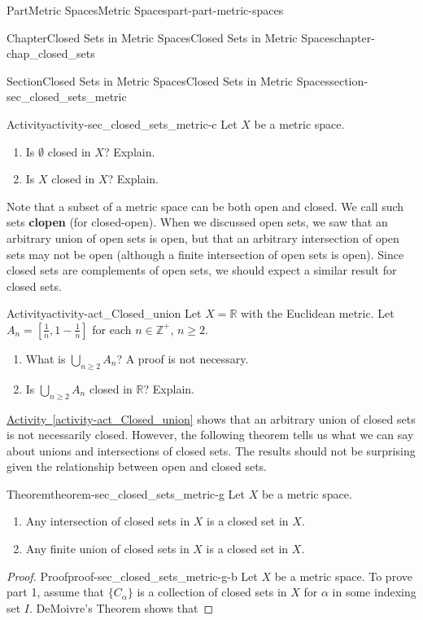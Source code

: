 \documentclass[oneside,10pt,]{book}
\newcommand{\xreffont}{\relax}
\newcommand{\terminology}[1]{\textbf{#1}}
\numberwithin{equation}{chapter}
\newcommand{\Z}{\mathbb{Z}}
\newcommand{\R}{\mathbb{R}}
\begin{document}
\begin{partptx}{Part}{Metric Spaces}{}{Metric Spaces}{}{}{part-part-metric-spaces}
\begin{chapterptx}{Chapter}{Closed Sets in Metric Spaces}{}{Closed Sets in Metric Spaces}{}{}{chapter-chap_closed_sets}
\begin{sectionptx}{Section}{Closed Sets in Metric Spaces}{}{Closed Sets in Metric Spaces}{}{}{section-sec_closed_sets_metric}
\begin{activity}{Activity}{}{activity-sec_closed_sets_metric-c}%
Let \(X\) be a metric space.%
\begin{enumerate}[font=\bfseries,label=(\alph*),ref=\alph*]%
\item{}Is \(\emptyset\) closed in \(X\)? Explain.%
\item{}Is \(X\) closed in \(X\)? Explain.%
\end{enumerate}%
\end{activity}%
Note that a subset of a metric space can be both open and closed. We call such sets \terminology{clopen} (for closed-open). When we discussed open sets, we saw that an arbitrary union of open sets is open, but that an arbitrary intersection of open sets may not be open (although a finite intersection of open sets is open). Since closed sets are complements of open sets, we should expect a similar result for closed sets.%
\begin{activity}{Activity}{}{activity-act_Closed_union}%
Let \(X = \R\) with the Euclidean metric. Let \(A_n = \left[\frac{1}{n}, 1-\frac{1}{n}\right]\) for each \(n \in \Z^+\), \(n \geq 2\).%
\begin{enumerate}[font=\bfseries,label=(\alph*),ref=\alph*]%
\item{}What is \(\bigcup_{n \geq 2} A_n\)? A proof is not necessary.%
\item{}Is \(\bigcup_{n \geq 2} A_n\) closed in \(\R\)? Explain.%
\end{enumerate}%
\end{activity}%
\hyperref[activity-act_Closed_union]{Activity~{\xreffont\ref{activity-act_Closed_union}}} shows that an arbitrary union of closed sets is not necessarily closed. However, the following theorem tells us what we can say about unions and intersections of closed sets. The results should not be surprising given the relationship between open and closed sets.%
\begin{theorem}{Theorem}{}{}{theorem-sec_closed_sets_metric-g}%
Let \(X\) be a metric space.%
\begin{enumerate}
\item{}Any intersection of closed sets in \(X\) is a closed set in \(X\).%
\item{}Any finite union of closed sets in \(X\) is a closed set in \(X\).%
\end{enumerate}
%
\end{theorem}
\begin{proof}{Proof}{}{proof-sec_closed_sets_metric-g-b}
Let \(X\) be a metric space. To prove part 1, assume that \(\{C_{\alpha}\}\) is a collection of closed sets in \(X\) for \(\alpha\) in some indexing set \(I\). DeMoivre's Theorem shows that%

\end{proof}
\end{sectionptx}
\end{chapterptx}
\end{partptx}
\end{document}
